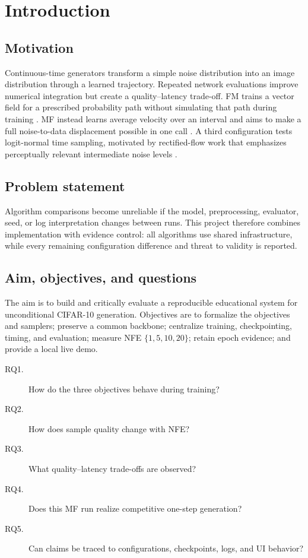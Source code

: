\documentclass{iutbscthesis}
\begin{document}
\chapter{Introduction}
\section{Motivation}
Continuous-time generators transform a simple noise distribution into an image distribution through a learned trajectory. Repeated network evaluations improve numerical integration but create a quality--latency trade-off. FM trains a vector field for a prescribed probability path without simulating that path during training \cite{lipman2023flow}. MF instead learns average velocity over an interval and aims to make a full noise-to-data displacement possible in one call \cite{geng2025mean}. A third configuration tests logit-normal time sampling, motivated by rectified-flow work that emphasizes perceptually relevant intermediate noise levels \cite{esser2024scaling}.
\section{Problem statement}
Algorithm comparisons become unreliable if the model, preprocessing, evaluator, seed, or log interpretation changes between runs. This project therefore combines implementation with evidence control: all algorithms use shared infrastructure, while every remaining configuration difference and threat to validity is reported.
\section{Aim, objectives, and questions}
The aim is to build and critically evaluate a reproducible educational system for unconditional CIFAR-10 generation. Objectives are to formalize the objectives and samplers; preserve a common backbone; centralize training, checkpointing, timing, and evaluation; measure NFE $\{1,5,10,20\}$; retain epoch evidence; and provide a local live demo.
\begin{description}
\item[RQ1.] How do the three objectives behave during training?
\item[RQ2.] How does sample quality change with NFE?
\item[RQ3.] What quality--latency trade-offs are observed?
\item[RQ4.] Does this MF run realize competitive one-step generation?
\item[RQ5.] Can claims be traced to configurations, checkpoints, logs, and UI behavior?
\end{description}
\end{document}
